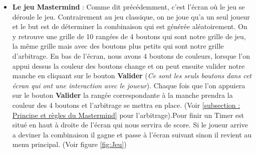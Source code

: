 \documentclass{article}
\begin{document}
\begin{itemize}
\item \textbf{Le jeu Mastermind} : Comme dit précédemment, c'est l'écran où le jeu se déroule le jeu. Contrairement au jeu classique, on ne joue qu'a un seul joueur et le but est de déterminer la combinaison qui est générée aléatoirement. 
\vspace{1\baselineskip}
On y retrouve une grille de 10 rangées de 4 boutons qui sont notre grille de jeu, la même grille mais avec des boutons plus petits qui sont notre grille d'arbitrage. En bas de l'écran, nous avons 4 boutons de couleurs, lorsque l'on appui dessus la couleur des boutons change et on peut ensuite valider notre manche en cliquant sur le bouton \textbf{Valider} (\textit{Ce sont les seuls boutons dans cet écran qui ont une interaction avec le joueur}). Chaque fois que l'on appuiera sur le bouton \textbf{Valider} la rangée correspondante à la manche prendra la couleur des 4 boutons et l'arbitrage se mettra en place. (Voir \ref{subsection : Principe et règles du Mastermind} pour l'arbitrage).Pour finir un Timer est situé en haut à droite de l'écran qui nous servira de score. 
\vspace{1\baselineskip}
Si le joueur arrive a deviner la combinaison il gagne et passe à l'écran suivant sinon il revient au menu principal. (Voir figure \ref{fig:Jeu})
\vspace{1\baselineskip}


\end{itemize}
\end{document}
